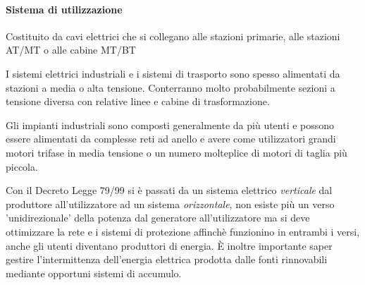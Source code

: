 \paragraph{Sistema di utilizzazione}
Costituito da cavi elettrici che si collegano alle stazioni primarie, alle stazioni AT/MT o 
alle cabine MT/BT

I sistemi elettrici industriali e i sistemi di trasporto sono spesso alimentati
da stazioni a media o alta tensione. Conterranno molto probabilmente sezioni a tensione
diversa con relative linee e cabine di trasformazione.

Gli impianti industriali sono composti generalmente da più utenti e possono essere alimentati
da complesse reti ad anello e avere come utilizzatori grandi motori trifase
in media tensione o un numero molteplice di motori di taglia più piccola.

Con il Decreto Legge 79/99 si è passati da un sistema elettrico \textit{verticale} dal produttore
all'utilizzatore ad un sistema \textit{orizzontale}, non esiste più un verso 'unidirezionale' della 
potenza dal generatore all'utilizzatore ma si deve ottimizzare la rete e i sistemi di protezione
affinchè funzionino in entrambi i versi, anche gli utenti diventano produttori di energia.
È inoltre importante saper gestire l'intermittenza dell'energia elettrica prodotta dalle fonti 
rinnovabili mediante opportuni sistemi di accumulo.

